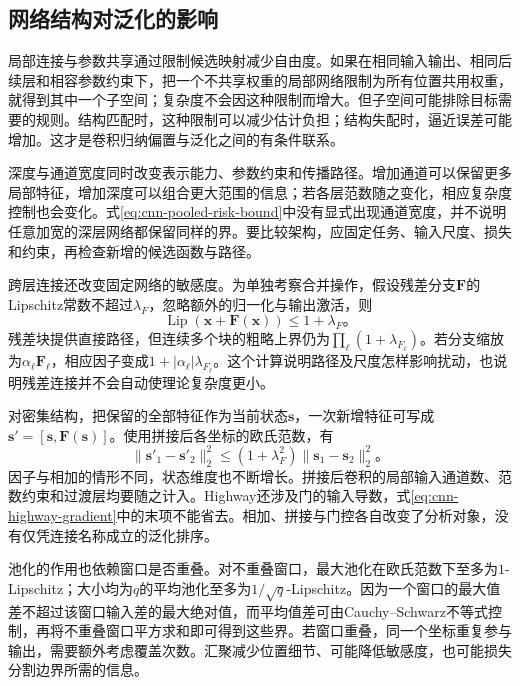 \subsection{网络结构对泛化的影响}
\label{sec:cnn-structure-generalization}

局部连接与参数共享通过限制候选映射减少自由度。如果在相同输入输出、相同后续层和相容参数约束下，把一个不共享权重的局部网络限制为所有位置共用权重，就得到其中一个子空间；复杂度不会因这种限制而增大。但子空间可能排除目标需要的规则。结构匹配时，这种限制可以减少估计负担；结构失配时，逼近误差可能增加。这才是卷积归纳偏置与泛化之间的有条件联系。

深度与通道宽度同时改变表示能力、参数约束和传播路径。增加通道可以保留更多局部特征，增加深度可以组合更大范围的信息；若各层范数随之变化，相应复杂度控制也会变化。式\eqref{eq:cnn-pooled-risk-bound}中没有显式出现通道宽度，并不说明任意加宽的深层网络都保留同样的界。要比较架构，应固定任务、输入尺度、损失和约束，再检查新增的候选函数与路径。

跨层连接还改变固定网络的敏感度。为单独考察合并操作，假设残差分支$\bm F$的Lipschitz常数不超过$\lambda_F$，忽略额外的归一化与输出激活，则
\begin{equation}
  \operatorname{Lip}(\bm x+\bm F(\bm x))\leq1+\lambda_F\text{。}
  \label{eq:cnn-residual-lipschitz}
\end{equation}
残差块提供直接路径，但连续多个块的粗略上界仍为$\prod_\ell(1+\lambda_{F_\ell})$。若分支缩放为$\alpha_\ell\bm F_\ell$，相应因子变成$1+|\alpha_\ell|\lambda_{F_\ell}$。这个计算说明路径及尺度怎样影响扰动，也说明残差连接并不会自动使理论复杂度更小。

对密集结构，把保留的全部特征作为当前状态$\bm s$，一次新增特征可写成$\bm s'=[\bm s,\bm F(\bm s)]$。使用拼接后各坐标的欧氏范数，有
\begin{equation}
  \lVert\bm s'_1-\bm s'_2\rVert_2^2
  \leq(1+\lambda_F^2)\lVert\bm s_1-\bm s_2\rVert_2^2\text{。}
  \label{eq:cnn-dense-lipschitz}
\end{equation}
因子与相加的情形不同，状态维度也不断增长。拼接后卷积的局部输入通道数、范数约束和过渡层均要随之计入。Highway还涉及门的输入导数，式\eqref{eq:cnn-highway-gradient}中的末项不能省去。相加、拼接与门控各自改变了分析对象，没有仅凭连接名称成立的泛化排序。

池化的作用也依赖窗口是否重叠。对不重叠窗口，最大池化在欧氏范数下至多为$1$-Lipschitz；大小均为$q$的平均池化至多为$1/\sqrt q$-Lipschitz。因为一个窗口的最大值差不超过该窗口输入差的最大绝对值，而平均值差可由Cauchy--Schwarz不等式控制，再将不重叠窗口平方求和即可得到这些界。若窗口重叠，同一个坐标重复参与输出，需要额外考虑覆盖次数。汇聚减少位置细节、可能降低敏感度，也可能损失分割边界所需的信息。

